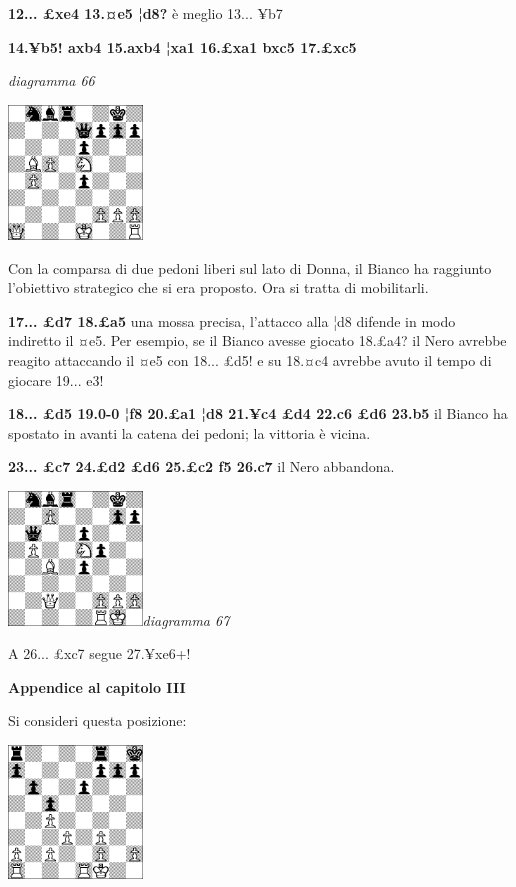 \documentclass[
]{article}
\begin{document}
\textbf{12... £xe4 13.¤e5 ¦d8?} è meglio 13... ¥b7

\textbf{14.¥b5! axb4 15.axb4 ¦xa1 16.£xa1 bxc5 17.£xc5}

\emph{diagramma 66}

\includegraphics[width=1.40972in,height=1.40972in]{vertopal_109f12be458a423d8f3cc838880eaea2/media/image66.png}

Con la comparsa di due pedoni liberi sul lato di Donna, il Bianco ha
raggiunto l'obiettivo strategico che si era proposto. Ora si tratta di
mobilitarli.

\textbf{17... £d7 18.£a5} una mossa precisa, l'attacco alla ¦d8 difende
in modo indiretto il ¤e5. Per esempio, se il Bianco avesse giocato
18.£a4? il Nero avrebbe reagito attaccando il ¤e5 con 18... £d5! e su
18.¤c4 avrebbe avuto il tempo di giocare 19... e3!

\textbf{18... £d5 19.0-0 ¦f8 20.£a1 ¦d8 21.¥c4 £d4 22.c6 £d6 23.b5} il
Bianco ha spostato in avanti la catena dei pedoni; la vittoria è vicina.

\textbf{23... £c7 24.£d2 £d6 25.£c2 f5 26.c7} il Nero abbandona.

\includegraphics[width=1.40139in,height=1.40139in]{vertopal_109f12be458a423d8f3cc838880eaea2/media/image67.png}\emph{diagramma
67}

A 26... £xc7 segue 27.¥xe6+!

\textbf{Appendice al capitolo III}

Si consideri questa posizione:

\includegraphics[width=1.40139in,height=1.40139in]{vertopal_109f12be458a423d8f3cc838880eaea2/media/image68.png}
\end{document}

